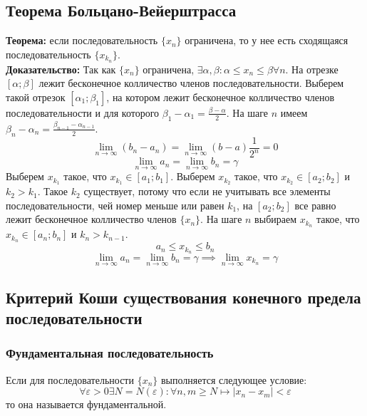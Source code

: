 \documentclass{article}
\begin{document}
    \subsection*{Теорема Больцано-Вейерштрасса}
        \textbf{Теорема:} если последовательность $\{x_n\}$ ограничена, то у нее есть сходящаяся последовательность $\{x_{k_n}\}$.
        \\
        \textbf{Доказательство:}
        Так как $\{x_n\}$ ограничена, $\exists \alpha, \beta: \alpha \le x_n \le \beta \forall n$.
        На отрезке $[\alpha; \beta]$ лежит бесконечное колличество членов последовательности.
        Выберем такой отрезок $[\alpha_1; \beta_1]$, на котором лежит бесконечное колличество членов последовательности
        и для которого $\beta_1 - \alpha_1 = \frac{\beta - \alpha}{2}$.
        На шаге $n$ имеем $\beta_n - \alpha_n = \frac{\beta_{n-1} - \alpha_{n-1}}{2}$.
        \[ \lim_{n\to\infty} (b_n - a_n) = \lim_{n\to\infty} (b - a)\frac{1}{2^n} = 0 \]
        \[ \lim_{n\to\infty} a_n = \lim_{n\to\infty} b_n = \gamma \]
        Выберем $x_{k_1}$ такое, что $x_{k_1} \in [a_1;b_1]$.
        Выберем $x_{k_2}$ такое, что $x_{k_2} \in [a_2;b_2]$ и $k_2 > k_1$. Такое $k_2$ существует, потому что если не учитывать все элементы
        последовательности, чей номер меньше или равен $k_1$, на $[a_2;b_2]$ все равно лежит бесконечное колличество членов $\{x_n\}$.
        На шаге $n$ выбираем $x_{k_n}$ такое, что $x_{k_n} \in [a_n;b_n]$ и $k_n > k_{n-1}$.
        \[ a_n \le x_{k_n} \le b_n \]
        \[ \lim_{n\to\infty} a_n = \lim_{n\to\infty} b_n = \gamma \implies \lim_{n\to\infty} x_{k_n} = \gamma \]
        
    
    \subsection*{Критерий Коши существования конечного предела последовательности}
        \subsubsection*{Фундаментальная последовательность}
        Если для последовательности $\{x_n\}$ выполняется следующее условие:
        \[ \forall \varepsilon > 0 \exists N = N(\varepsilon): \forall n,m \ge N \longmapsto |x_n - x_m| < \varepsilon \]
        то она называется фундаментальной.
        
\end{document}
